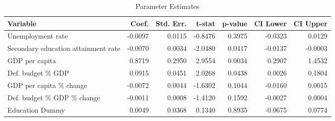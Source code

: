 \clearpage

\begin{table}[H]
\caption{Parameter Estimates}
\centering
\begin{threeparttable}
\begin{tabularx}{\textwidth}{@{}Xrrrrrr@{}}
\toprule
\textbf{Variable} & \textbf{Coef.} & \textbf{Std. Err.} & \textbf{t-stat} & \textbf{p-value} & \textbf{CI Lower} & \textbf{CI Upper} \\
\midrule
Unemployment rate & -0.0097 & 0.0115 & -0.8476 & 0.3975 & -0.0323 & 0.0129 \\
Secondary education attainment rate & -0.0070 & 0.0034 & -2.0480 & 0.0417 & -0.0137 & -0.0003 \\
GDP per capita & 0.8719 & 0.2950 & 2.9554 & 0.0034 & 0.2907 & 1.4532 \\
Def. budget \% GDP & 0.0915 & 0.0451 & 2.0268 & 0.0438 & 0.0026 & 0.1804 \\
GDP per capita \% change & -0.0072 & 0.0044 & -1.6302 & 0.1044 & -0.0160 & 0.0015 \\
Def. budget \% GDP \% change & -0.0011 & 0.0008 & -1.4120 & 0.1592 & -0.0027 & 0.0004 \\
Education Dummy & 0.0049 & 0.0368 & 0.1340 & 0.8935 & -0.0675 & 0.0774 \\
\bottomrule
\end{tabularx}
\end{threeparttable}
\label{tab:twoway_model}
\end{table}


